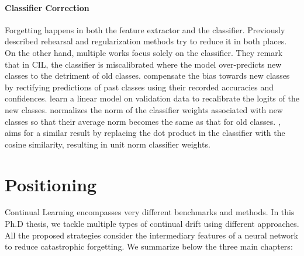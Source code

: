 \paragraph{Classifier Correction} Forgetting happens in both the feature extractor and the
classifier. Previously described rehearsal and regularization methods try to reduce it in both
places. On the other hand, multiple works focus solely on the classifier. They remark that in
\acf{CIL}, the classifier is miscalibrated \citep{guo2017miscalibration} where the model
over-predicts new classes to the detriment of old classes. \citet{belouadah2019il2m} compensate the
bias towards new classes by rectifying predictions of past classes using their recorded accuracies
and confidences. \citet{wu2019bias_correction} learn a linear model on validation data to recalibrate
the logits of the new classes. \citet{zhao2020weightalignement} normalizes the norm of the classifier
weights associated with new classes so that their average norm becomes the same as that for old
classes. \citet{hou2019ucir}, aims for a similar result by replacing the dot product in the
classifier with the cosine similarity, resulting in unit norm classifier weights.

\section{Positioning}

Continual Learning encompasses very different benchmarks and methods. In this Ph.D thesis, we tackle
multiple types of continual drift using different approaches. All the proposed strategies consider
the intermediary features of a neural network to reduce catastrophic forgetting. We summarize
below the three main chapters:

